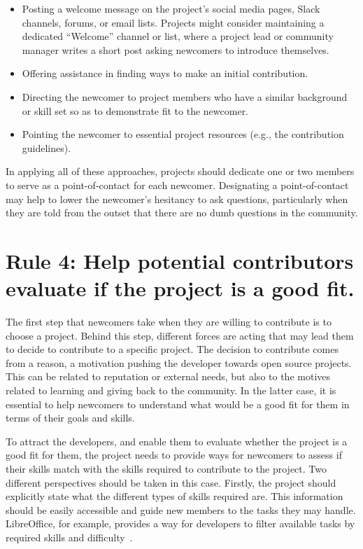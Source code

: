 \documentclass[10pt,letterpaper]{article}
\newcommand{\rulemajor}[1]{\section*{#1}}
\begin{document}
\begin{itemize}

\item
  Posting a welcome message on the project's social media pages, Slack channels, forums, or email lists.
  Projects might consider maintaining a dedicated ``Welcome'' channel or list,
  where a project lead or community manager writes a short post asking newcomers to introduce themselves.

\item
  Offering assistance in finding ways to make an initial contribution.

\item
  Directing the newcomer to project members who have a similar background or skill set
  so as to demonstrate fit to the newcomer.

\item
  Pointing the newcomer to essential project resources (e.g., the contribution guidelines).

\end{itemize}

In applying all of these approaches,
projects should dedicate one or two members to serve as a point-of-contact for each newcomer.
Designating a point-of-contact may help to lower the newcomer's hesitancy to ask questions,
particularly when they are told from the outset that there are no dumb questions in the community.

\rulemajor{Rule 4: Help potential contributors evaluate if the project is a good fit.}

The first step that newcomers take when they are willing to contribute is to choose a project.
Behind this step,
different forces are acting that may lead them to decide to contribute to a specific project.
The decision to contribute comes from a reason,
a motivation pushing the developer towards open source projects.
This can be related to reputation or external needs,
but also to the motives related to learning and giving back to the community.
In the latter case,
it is essential to help newcomers to understand what would be a good fit for them in terms of their goals and skills.

To attract the developers,
and enable them to evaluate whether the project is a good fit for them,
the project needs to provide ways for newcomers to assess if their skills match with the skills required to contribute to the project.
Two different perspectives should be taken in this case.
Firstly,
the project should explicitly state what the different types of skills required are.
This information should be easily accessible and guide new members to the tasks they may handle.
LibreOffice,
for example,
provides a way for developers to filter available tasks by required skills and difficulty~\cite{libreoffice-filtered}.
\end{document}
